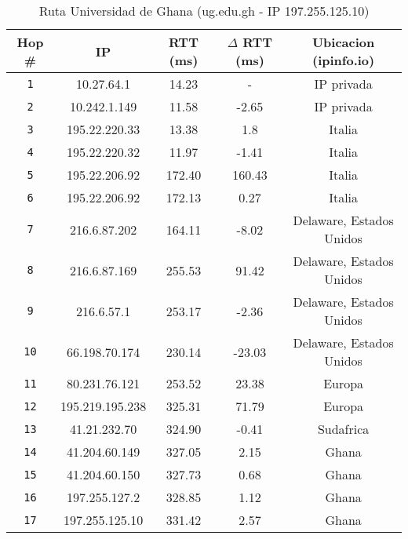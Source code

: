 \begin{table}[ht]\begin{center}
    \begin{tabular}{|c|c|c|c|c|}
    \hline
    \textbf{Hop \#} & \textbf{IP} & \textbf{RTT (ms)} & \textbf{$\Delta$ RTT (ms)} & \textbf{Ubicacion (ipinfo.io)} \\ \hline
    \texttt{1}  & 10.27.64.1      & 14.23             & -                     & IP privada                     \\ \hline
    \texttt{2}  & 10.242.1.149    & 11.58             & -2.65                 & IP privada                     \\ \hline
    \texttt{3}  & 195.22.220.33   & 13.38             & 1.8                   & Italia                         \\ \hline
    \texttt{4}  & 195.22.220.32   & 11.97             & -1.41                 & Italia                         \\ \hline
    \texttt{5}  & 195.22.206.92   & 172.40            & 160.43                & Italia                         \\ \hline
    \texttt{6}  & 195.22.206.92   & 172.13            & 0.27                  & Italia                         \\ \hline
    \texttt{7}  & 216.6.87.202    & 164.11            & -8.02                 & Delaware, Estados Unidos       \\ \hline
    \texttt{8}  & 216.6.87.169    & 255.53            & 91.42                 & Delaware, Estados Unidos       \\ \hline
    \texttt{9}  & 216.6.57.1      & 253.17            & -2.36                 & Delaware, Estados Unidos       \\ \hline
    \texttt{10} & 66.198.70.174   & 230.14            & -23.03                & Delaware, Estados Unidos       \\ \hline
    \texttt{11} & 80.231.76.121   & 253.52            & 23.38                 & Europa                         \\ \hline
    \texttt{12} & 195.219.195.238 & 325.31            & 71.79                 & Europa                         \\ \hline
    \texttt{13} & 41.21.232.70    & 324.90            & -0.41                 & Sudafrica                      \\ \hline
    \texttt{14} & 41.204.60.149   & 327.05            & 2.15                  & Ghana                          \\ \hline
    \texttt{15} & 41.204.60.150   & 327.73            & 0.68                  & Ghana                          \\ \hline
    \texttt{16} & 197.255.127.2   & 328.85            & 1.12                  & Ghana                          \\ \hline
    \texttt{17} & 197.255.125.10  & 331.42            & 2.57                  & Ghana                          \\ \hline
    \end{tabular}
    \caption{Ruta Universidad de Ghana (ug.edu.gh  - IP 197.255.125.10)}
\end{center}
\end{table}

